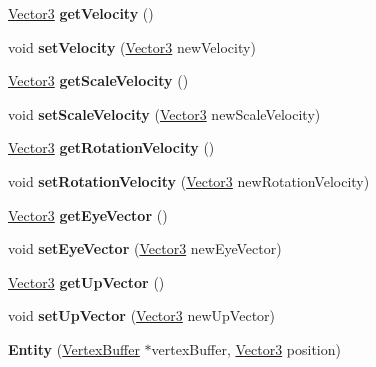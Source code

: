\begin{DoxyCompactItemize}
\item 
\hypertarget{class_entity_ace81d20203e8644e6dd438ac2a6c4a59}{}\hyperlink{struct_vector3}{Vector3} {\bfseries get\+Velocity} ()\label{class_entity_ace81d20203e8644e6dd438ac2a6c4a59}

\item 
\hypertarget{class_entity_a9e46448e3328bdb6602b0f680edb12e0}{}void {\bfseries set\+Velocity} (\hyperlink{struct_vector3}{Vector3} new\+Velocity)\label{class_entity_a9e46448e3328bdb6602b0f680edb12e0}

\item 
\hypertarget{class_entity_a3c67d18672cbfb2a0190dea197dc09e0}{}\hyperlink{struct_vector3}{Vector3} {\bfseries get\+Scale\+Velocity} ()\label{class_entity_a3c67d18672cbfb2a0190dea197dc09e0}

\item 
\hypertarget{class_entity_a05af39fabdba6f2fda887bafc253eecc}{}void {\bfseries set\+Scale\+Velocity} (\hyperlink{struct_vector3}{Vector3} new\+Scale\+Velocity)\label{class_entity_a05af39fabdba6f2fda887bafc253eecc}

\item 
\hypertarget{class_entity_ae82bc820751faefaa363d77b12e68b46}{}\hyperlink{struct_vector3}{Vector3} {\bfseries get\+Rotation\+Velocity} ()\label{class_entity_ae82bc820751faefaa363d77b12e68b46}

\item 
\hypertarget{class_entity_a88c3bd5cfa53c5015d5dde07abef982b}{}void {\bfseries set\+Rotation\+Velocity} (\hyperlink{struct_vector3}{Vector3} new\+Rotation\+Velocity)\label{class_entity_a88c3bd5cfa53c5015d5dde07abef982b}

\item 
\hypertarget{class_entity_a751ac8dd25c0253862f5605a90647cb8}{}\hyperlink{struct_vector3}{Vector3} {\bfseries get\+Eye\+Vector} ()\label{class_entity_a751ac8dd25c0253862f5605a90647cb8}

\item 
\hypertarget{class_entity_a6851ac6681af20e5002498beb5c460b4}{}void {\bfseries set\+Eye\+Vector} (\hyperlink{struct_vector3}{Vector3} new\+Eye\+Vector)\label{class_entity_a6851ac6681af20e5002498beb5c460b4}

\item 
\hypertarget{class_entity_a8baad3640c4e9f84aac3a1455cfc3486}{}\hyperlink{struct_vector3}{Vector3} {\bfseries get\+Up\+Vector} ()\label{class_entity_a8baad3640c4e9f84aac3a1455cfc3486}

\item 
\hypertarget{class_entity_a55bde5ca34b393158054b75f4f987a63}{}void {\bfseries set\+Up\+Vector} (\hyperlink{struct_vector3}{Vector3} new\+Up\+Vector)\label{class_entity_a55bde5ca34b393158054b75f4f987a63}

\item 
\hypertarget{class_entity_a78e844313155c89099d5467bd81f149d}{}{\bfseries Entity} (\hyperlink{class_vertex_buffer}{Vertex\+Buffer} $\ast$vertex\+Buffer, \hyperlink{struct_vector3}{Vector3} position)\label{class_entity_a78e844313155c89099d5467bd81f149d}

\end{DoxyCompactItemize}


